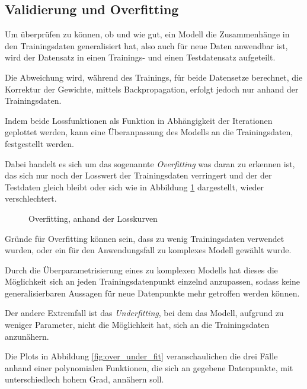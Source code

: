 \subsection{Validierung und Overfitting}\label{subsec:validation}

Um überprüfen zu können, ob und wie gut, ein Modell die Zusammenhänge
in den Trainingsdaten generalisiert hat, also auch für neue Daten
anwendbar ist,
wird der Datensatz in einen Trainings- und
einen Testdatensatz aufgeteilt.

Die Abweichung wird, während des Trainings, für beide Datensetze 
berechnet, die Korrektur der Gewichte, mittels Backpropagation, erfolgt
jedoch nur anhand der Trainingsdaten.

Indem beide Lossfunktionen als Funktion in Abhängigkeit 
der Iterationen geplottet werden, kann eine Überanpassung
des Modells an die Trainingsdaten, festgestellt werden.

Dabei handelt es sich um das sogenannte \textit{Overfitting}
was daran zu erkennen ist, das sich nur noch der Losswert der 
Trainingsdaten verringert und der der Testdaten 
gleich bleibt oder sich wie in Abbildung \ref{fig:overfitting}
dargestellt, wieder verschlechtert.

\vspace{1cm}
\begin{figure}[H]
    \centering
    \def\svgwidth{0.5\textwidth}
    
    \caption{Overfitting, anhand der Losskurven}
    \label{fig:overfitting}
\end{figure}
\vspace{1cm}

Gründe für Overfitting können sein, dass zu wenig Trainingsdaten
verwendet wurden, oder ein für den Anwendungsfall 
zu komplexes Modell gewählt wurde.

Durch die Überparametrisierung eines zu komplexen Modells hat 
dieses die Möglichkeit sich an jeden Trainingsdatenpunkt einzelnd
anzupassen, sodass keine generalisierbaren 
Aussagen für neue Datenpunkte mehr getroffen werden können.


Der andere Extremfall ist das \textit{Underfitting}, 
bei dem das Modell, aufgrund zu weniger Parameter, nicht die 
Möglichkeit hat, sich an die Trainingsdaten anzunähern.

Die Plots in Abbildung \ref{fig:over_under_fit} veranschaulichen 
die drei Fälle anhand einer polynomialen Funktionen,
die sich an gegebene Datenpunkte, mit unterschiedlech hohem 
Grad, annähern soll.

